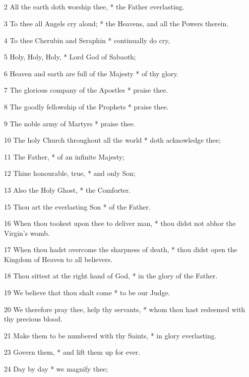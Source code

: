 \subsection{}

2 All the earth doth worship thee, * the Father everlasting.

3 To thee all Angels cry aloud; * the Heavens, and all the Powers therein.

4 To thee Cherubin and Seraphin * continually do cry,

5 Holy, Holy, Holy, * Lord God of Sabaoth;

6 Heaven and earth are full of the Majesty * of thy glory.

7 The glorious company of the Apostles * praise thee.

8 The goodly fellowship of the Prophets * praise thee.

9 The noble army of Martyrs * praise thee.

10 The holy Church throughout all the world * doth acknowledge thee;

11 The Father, * of an infinite Majesty;

12 Thine honourable, true, * and only Son;

13 Also the Holy Ghost, * the Comforter.



15 Thou art the everlasting Son * of the Father.

16 When thou tookest upon thee to deliver man, * thou didst not abhor the Virgin's womb.

17 When thou hadst overcome the sharpness of death, * thou didst open the Kingdom of Heaven to all believers.

18 Thou sittest at the right hand of God, * in the glory of the Father.

19 We believe that thou shalt come * to be our Judge.

20 We therefore pray thee, help thy servants, * whom thou hast redeemed with thy precious blood.

21 Make them to be numbered with thy Saints, * in glory everlasting.



23 Govern them, * and lift them up for ever.

24 Day by day * we magnify thee;

